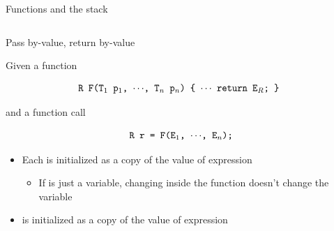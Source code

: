 \begin{frame}[fragile]{Functions and the stack}
\begin{columns}
  \end{columns}


\end{frame}

\begin{frame}{Pass by-value, return by-value}

  Given a function


  \begin{equation*}
    \code{R F(T$_1$ p}\tikzref{p1}\code{$_1$, \ddd, T$_n$ p}\tikzref{pn}\code{$_n$) \{ \ddd{} return E}\tikzref{er}\code{$_R$; \} }
  \end{equation*}

  and a function call

  \begin{equation*}
    \code{R r}\tikzref{r}\code{ = F(E}\tikzref{e1}\code{$_1$, \ddd, E}\tikzref{en}\code{$_n$);}
  \end{equation*}

  \begin{itemize}
  \item<2-> Each  is initialized as a \alert{copy} of the value of
    expression 
    \begin{itemize}
    \item If  is just a variable, changing  inside the
      function doesn't change the variable
    \end{itemize}
  \item<3->  is initialized as a \alert{copy} of the value of expression
  \end{itemize}


\end{frame}

